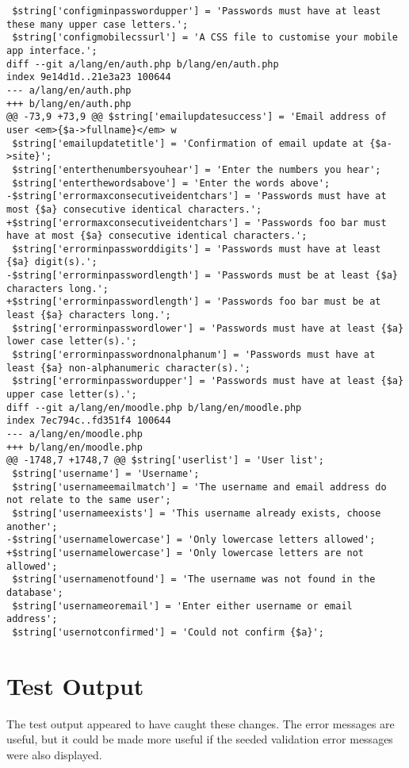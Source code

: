 \documentclass{article}
\begin{document}
\begin{verbatim}
 $string['configminpasswordupper'] = 'Passwords must have at least these many upper case letters.';
 $string['configmobilecssurl'] = 'A CSS file to customise your mobile app interface.';
diff --git a/lang/en/auth.php b/lang/en/auth.php
index 9e14d1d..21e3a23 100644
--- a/lang/en/auth.php
+++ b/lang/en/auth.php
@@ -73,9 +73,9 @@ $string['emailupdatesuccess'] = 'Email address of user <em>{$a->fullname}</em> w
 $string['emailupdatetitle'] = 'Confirmation of email update at {$a->site}';
 $string['enterthenumbersyouhear'] = 'Enter the numbers you hear';
 $string['enterthewordsabove'] = 'Enter the words above';
-$string['errormaxconsecutiveidentchars'] = 'Passwords must have at most {$a} consecutive identical characters.';
+$string['errormaxconsecutiveidentchars'] = 'Passwords foo bar must have at most {$a} consecutive identical characters.';
 $string['errorminpassworddigits'] = 'Passwords must have at least {$a} digit(s).';
-$string['errorminpasswordlength'] = 'Passwords must be at least {$a} characters long.';
+$string['errorminpasswordlength'] = 'Passwords foo bar must be at least {$a} characters long.';
 $string['errorminpasswordlower'] = 'Passwords must have at least {$a} lower case letter(s).';
 $string['errorminpasswordnonalphanum'] = 'Passwords must have at least {$a} non-alphanumeric character(s).';
 $string['errorminpasswordupper'] = 'Passwords must have at least {$a} upper case letter(s).';
diff --git a/lang/en/moodle.php b/lang/en/moodle.php
index 7ec794c..fd351f4 100644
--- a/lang/en/moodle.php
+++ b/lang/en/moodle.php
@@ -1748,7 +1748,7 @@ $string['userlist'] = 'User list';
 $string['username'] = 'Username';
 $string['usernameemailmatch'] = 'The username and email address do not relate to the same user';
 $string['usernameexists'] = 'This username already exists, choose another';
-$string['usernamelowercase'] = 'Only lowercase letters allowed';
+$string['usernamelowercase'] = 'Only lowercase letters are not allowed';
 $string['usernamenotfound'] = 'The username was not found in the database';
 $string['usernameoremail'] = 'Enter either username or email address';
 $string['usernotconfirmed'] = 'Could not confirm {$a}';
\end{verbatim}

\section{Test Output}

The test output appeared to have caught these changes.
The error messages are useful, but it could be made more useful if the seeded validation error messages
were also displayed.
\end{document}
